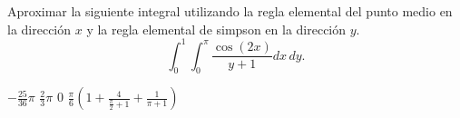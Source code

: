 \begin{pregunta}
\begin{cuerpo}
Aproximar la siguiente integral utilizando la regla elemental del punto medio en la direcci\'on $x$ y la regla elemental de simpson en la direcci\'on $y$.
$$
\int_0^1 \int_0^\pi \frac{\cos(2x)}{y+1} dx\,dy.
$$
\end{cuerpo}
\begin{multicols}{4}
\begin{alternativas}
{$-\frac{25}{36}\pi$} %
{$\frac{2}{3}\pi$} 
{$0$} 
{$\frac{\pi}{6}\left(1+\frac{4}{\frac{\pi}{2}+1}+\frac{1}{\pi+1}\right)$}
\end{alternativas}
\end{multicols}
\justificacion{7cm}
\end{pregunta}
